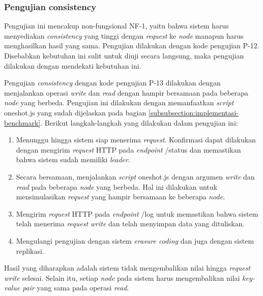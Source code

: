 \subsubsection{Pengujian consistency}
\label{subsubsection:pengujian-consistency}

Pengujian ini mencakup non-fungsional NF-1, yaitu bahwa sistem harus menyediakan \textit{consistency} yang tinggi dengan \textit{request} ke \textit{node} manapun harus menghasilkan hasil yang sama. Pengujian dilakukan dengan kode pengujian P-12. Disebabkan kebutuhan ini sulit untuk diuji secara langsung, maka pengujian dilakukan dengan mendekati kebutuhan ini. 


Pengujian \textit{consistency} dengan kode pengujian P-13 dilakukan dengan menjalankan operasi \textit{write} dan \textit{read} dengan hampir bersamaan pada beberapa \textit{node} yang berbeda. Pengujian ini dilakukan dengan memanfaatkan \textit{script} oneshot.js yang sudah dijelaskan pada bagian \ref{subsubsection:implementasi-benchmark}. Berikut langkah-langkah yang dilakukan dalam pengujian ini:

\begin{enumerate}
    \item Menunggu hingga sistem siap menerima \textit{request}. Konfirmasi dapat dilakukan dengan mengirim \textit{request} HTTP pada \textit{endpoint} /status dan memastikan bahwa sistem sudah memiliki \textit{leader}.
    \item Secara bersamaan, menjalankan \textit{script} oneshot.js dengan argumen \textit{write} dan \textit{read} pada beberapa \textit{node} yang berbeda. Hal ini dilakukan untuk mensimulasikan \textit{request} yang hampir bersamaan ke beberapa \textit{node}.
    \item Mengirim \textit{request} HTTP pada \textit{endpoint} /log untuk memastikan bahwa sistem telah menerima \textit{request} \textit{write} dan telah menyimpan data yang dituliskan.
    \item Mengulangi pengujian dengan sistem \textit{erasure coding} dan juga dengan sistem replikasi.
\end{enumerate}

Hasil yang diharapkan adalah sistem tidak mengembalikan nilai hingga \textit{request} \textit{write} selesai. Selain itu, setiap \textit{node} pada sistem harus mengembalikan nilai \textit{key-value pair} yang sama pada operasi \textit{read}.

